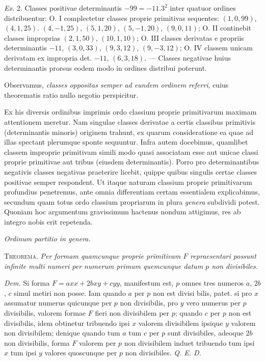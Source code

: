 \textit{Ex.} 2. Classes positivae determinantis $-99=-11.3^2$ inter quatuor ordines distribuentur: O. I complectetur classes proprie primitivas sequentes: $(1,0,99)$, $(4,1,25)$. $(4,-1,25)$, $(5,1,20)$, $(5,-1,20)$, $(9,0,11)$; O. II continebit classes improprias $(2,1,50)$, $(10,1,10)$; O. III classes derivatas e propriis determinantis $-11$, $(3,0,33)$, $(9,3,12)$, $(9,-3,12)$; O. IV classem unicam derivatam ex impropria det. $-11$, $(6,3,18)$. --- Classes negativae huius determinantis prorsus eodem modo in ordines distribui poterunt.

Observamus, \textit{classes oppositas semper ad eundem ordinem referri}, cuius theorematis ratio nullo negotio perspicitur.

Ex his diversis ordinibus imprimis ordo classium proprie primitivarum maximam attentionem meretur. Nam singulae classes derivatae a certis classibus primitivis (determinantis minoris) originem trahunt, ex quarum consideratione ea quae ad illas spectant plerumque sponte sequuntur. Infra autem docebimus, quamlibet classem improprie primitivam simili modo quasi associatam esse aut unicae classi proprie primitivae aut tribus (eiusdem determinantis). Porro pro determinantibus negativis classes negativas praeterire licebit, quippe quibus singulis certae classes positivae semper respondent. Ut itaque naturam classium proprie primitivarum profundius penetremus, ante omnia differentiam certam essentialem explicabimus, secundum quam totus ordo classium propriarum in plura \textit{genera} subdividi potest. Quoniam hoc argumentum gravissimum hactenus nondum attigimus, res ab integro nobis erit repetenda.

\begin{center}
\textit{Ordinum partitio in genera.}
\end{center}

\textsc{Theorema.} \textit{Per formam quamcunque proprie primitivam $F$ repraesentari possunt infinite multi numeri per numerum primum quemcunque datum $p$ non divisibiles.}

\textit{Dem.} Si forma $F=axx+2bxy+cyy$, manifestum est, $p$ omnes tres numeros $a$, $2b$, $c$ simul metiri non posse. Iam quando $a$ per $p$ non est divisi%
%
bilis, patet. si pro $x$ assumatur numerus quicunque per $p$ non divisibilis, pro $y$ vero numerus per $p$ divisibilis, valorem formae $F$ fieri non divisibilem per $p$; quando $c$ per $p$ non est divisibilis, idem obtinetur tribuendo ipsi $x$ valorem divisibilem ipsique $y$ valorem non divisibilem; denique quando tum $a$ tum $c$ per $p$ sunt divisibiles, adeoque $2b$ non divisibilis, forma $F$ valorem per $p$ non divisibilem induet tribuendo tum ipsi $x$ tum ipsi $y$ valores quoscunque per $p$ non divisibiles. \textit{Q. E. D.}


